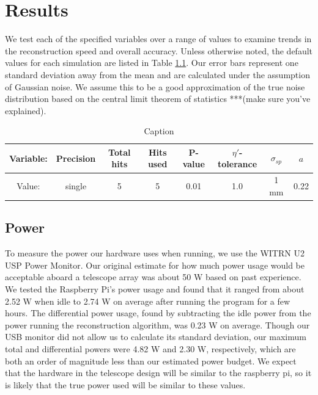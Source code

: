 \chapter{Results}
We test each of the specified variables over a range of values to examine trends in the reconstruction speed and overall accuracy. Unless otherwise noted, the default values for each simulation are listed in Table \ref{tab:def_vals}. Our error bars represent one standard deviation away from the mean and are calculated under the assumption of Gaussian noise. We assume this to be a good approximation of the true noise distribution based on the central limit theorem of statistics ***(make sure you've explained).\\

\begin{table}[h]
    \centering
    \begin{tabular}{|c|c|c|c|c|c|c|c|}
    \hline
    Variable: & Precision & Total hits & Hits used & P-value & $\eta'$-tolerance & $\sigma_{sp}$ & $a$ \\
    \hline
    Value: & single & 5 & 5 & 0.01 & 1.0 & 1 mm & 0.22 \\
    \hline
    \end{tabular}
    \caption{Caption}
    \label{tab:def_vals}
\end{table}

\section{Power}
To measure the power our hardware uses when running, we use the WITRN U2 USP Power Monitor\cite{WITRN}. Our original estimate for how much power usage would be acceptable aboard a telescope array was about 50 W based on past experience. We tested the Raspberry Pi's power usage and found that it ranged from about 2.52 W when idle to 2.74 W on average after running the program for a few hours. The differential power usage, found by subtracting the idle power from the power running the reconstruction algorithm, was 0.23 W on average. Though our USB monitor did not allow us to calculate its standard deviation, our maximum total and differential powers were 4.82 W and 2.30 W, respectively, which are both an order of magnitude less than our estimated power budget. We expect that the hardware in the telescope design will be similar to the raspberry pi, so it is likely that the true power used will be similar to these values.

